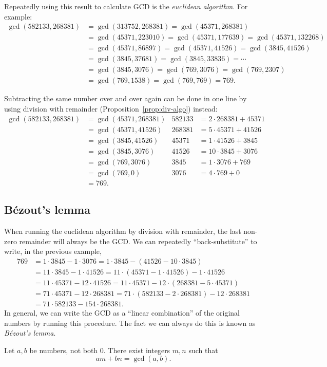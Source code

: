 Repeatedly using this result to calculate GCD is the \emph{euclidean algorithm}. For example:
\begin{align*}
\gcd(582133, 268381) &= \gcd(313752, 268381) = \gcd(45371, 268381) \\
&= \gcd(45371, 223010) = \gcd(45371, 177639) = \gcd(45371, 132268) \\
&= \gcd(45371, 86897) = \gcd(45371, 41526) = \gcd(3845, 41526) \\
&= \gcd(3845, 37681) = \gcd(3845, 33836) = \cdots \\
&= \gcd(3845, 3076) = \gcd(769, 3076) = \gcd(769, 2307) \\
&= \gcd(769, 1538) = \gcd(769, 769) = \boxed{769}.
\end{align*}

Subtracting the same number over and over again can be done in one line by using division with remainder (Proposition~\ref{prop:div-algo}) instead:
\begin{align*}
\gcd(582133, 268381) &= \gcd(45371, 268381) & 582133 &= 2\cdot 268381 + 45371 \\
&= \gcd(45371, 41526) & 268381 &= 5\cdot 45371 + 41526 \\
&= \gcd(3845, 41526) & 45371 &= 1\cdot 41526 + 3845 \\
&= \gcd(3845, 3076) & 41526 &= 10\cdot 3845 + 3076 \\
&= \gcd(769, 3076) & 3845 &= 1\cdot 3076 + 769 \\
&= \gcd(769, 0) & 3076 &= 4\cdot 769 + 0 \\
&= \boxed{769}.
\end{align*}


\subsection{B\'{e}zout's lemma}

When running the euclidean algorithm by division with remainder, the last non-zero remainder will always be the GCD. We can repeatedly ``back-substitute'' to write, in the previous example,
\begin{align*}
769 &= 1\cdot 3845 - 1\cdot 3076 = 1\cdot 3845 - (41526 - 10\cdot 3845) \\
&= 11\cdot 3845 - 1\cdot 41526 = 11\cdot (45371 - 1\cdot 41526) - 1\cdot 41526 \\
&= 11\cdot 45371 - 12\cdot 41526 = 11\cdot 45371 - 12\cdot (268381 - 5\cdot 45371) \\
&= 71\cdot 45371 - 12\cdot 268381 = 71\cdot (582133 - 2\cdot 268381) - 12\cdot 268381 \\
&= 71\cdot 582133 - 154\cdot 268381.
\end{align*}
In general, we can write the GCD as a ``linear combination'' of the original numbers by running this procedure. The fact we can always do this is known as \emph{B\'{e}zout's lemma}.
\begin{lemma}[B\'{e}zout]\label{lem:bezout}
Let $a,b$ be numbers, not both $0$. There exist integers $m,n$ such that
\begin{equation*}
am + bn = \gcd(a,b).
\end{equation*}
\end{lemma}


